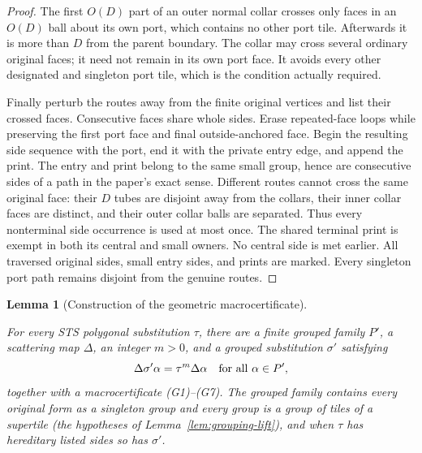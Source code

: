 \documentclass[11pt,a4paper]{article}
\newtheorem{lemma}[definition]{Lemma}
\theoremstyle{remark}
\newcommand{\lean}[1]{}
\newcommand{\uses}[1]{}
\begin{document}
\begin{proof}
The first $O(D)$ part of an outer normal collar crosses only faces in
an $O(D)$ ball about its own port, which contains no other port tile.
Afterwards it is more than $D$ from the parent boundary.  The collar may
cross several ordinary original faces; it need not remain in its own
port face.  It avoids every other designated and singleton port tile,
which is the condition actually required.

Finally perturb the routes away from the finite original vertices and
list their crossed faces.  Consecutive faces share whole sides.  Erase
repeated-face loops while preserving the first port face and final
outside-anchored face.  Begin the resulting side sequence with the
port, end it with the private entry edge, and append the print.  The
entry and print belong to the same small group, hence are consecutive
sides of a path in the paper's exact sense.  Different routes cannot
cross the same original face: their $D$ tubes are disjoint away from
the collars, their inner collar faces are distinct, and their outer
collar balls are separated.  Thus every nonterminal side occurrence
is used at most once.  The shared terminal print is exempt in both
its central and small owners.  No central side is met earlier.
All traversed original sides, small entry sides, and prints are marked.
Every singleton port path remains disjoint from the genuine routes.
\end{proof}

\begin{lemma}[Construction of the geometric macrocertificate]
\label{lem:certificate-exists}
\lean{Tilings.Geometry.existsMacroCertificate}
\uses{def:substitution,def:sts,def:certificate,lem:regular-grouping,lem:outside-grouping,lem:annular-spokes,lem:quantitative-sector,lem:fingerprint,lem:routing,lem:finite-idempotent,lem:inner-sector-order}
For every STS polygonal substitution $\tau$, there are a finite grouped
family $P'$, a scattering map $\Delta$, an integer $m>0$, and a grouped
substitution $\sigma'$ satisfying
\[
 \Delta\sigma'\alpha=\tau^m\Delta\alpha
 \quad\hbox{for all }\alpha\in P',
\]
together with a macrocertificate (G1)--(G7).  The grouped family contains
every original form as a singleton group and every group is a group of tiles
of a supertile (the hypotheses of
Lemma~\ref{lem:grouping-lift}), and when $\tau$ has hereditary listed
sides so has $\sigma'$.
\end{lemma}
\end{document}
